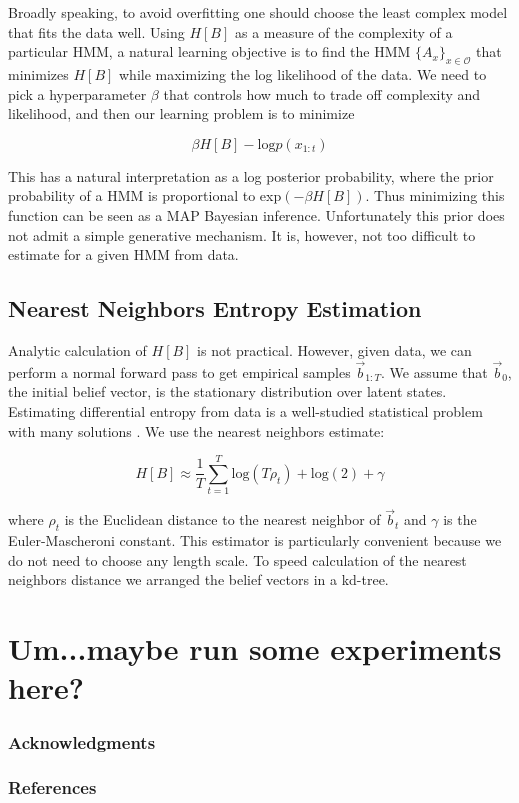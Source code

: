 \documentclass{article} %
\begin{document}
Broadly speaking, to avoid overfitting one should choose the least complex model that fits the data well.  Using $H[B]$ as a measure of the complexity of a particular HMM, a natural learning objective is to find the HMM $\{A_x\}_{x\in\mathcal{O}}$ that minimizes $H[B]$ while maximizing the log likelihood of the data.  We need to pick a hyperparameter $\beta$ that controls how much to trade off complexity and likelihood, and then our learning problem is to minimize

\begin{equation}
\beta H[B] - \mathrm{log}p(x_{1:t})
\end{equation}

This has a natural interpretation as a log posterior probability, where the prior probability of a HMM is proportional to exp$(-\beta H[B])$.  Thus minimizing this function can be seen as a MAP Bayesian inference.  Unfortunately this prior does not admit a simple generative mechanism.  It is, however, not too difficult to estimate for a given HMM from data.

\subsection{Nearest Neighbors Entropy Estimation}

Analytic calculation of $H[B]$ is not practical.  However, given data, we can perform a normal forward pass to get empirical samples $\vec{b}_{1:T}$.  We assume that $\vec{b}_0$, the initial belief vector, is the stationary distribution over latent states.  Estimating differential entropy from data is a well-studied statistical problem with many solutions \cite{Beirlant}.  We use the nearest neighbors estimate:

\begin{equation}
H[B] \approx \frac{1}{T}\sum_{t=1}^T \mathrm{log}(T\rho_t) + \mathrm{log}(2) + \gamma
\label{nn-entropy}
\end{equation}

where $\rho_t$ is the Euclidean distance to the nearest neighbor of $\vec{b}_t$ and $\gamma$ is the Euler-Mascheroni constant.  This estimator is particularly convenient because we do not need to choose any length scale.  To speed calculation of the nearest neighbors distance we arranged the belief vectors in a kd-tree.

\section{Um...maybe run some experiments here?}

\subsubsection*{Acknowledgments}


\subsubsection*{References}

\small{

}
\end{document}
